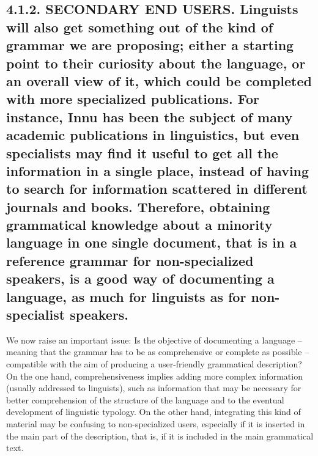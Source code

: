 \documentclass[letterpaper]{article}
\begin{document}
\subsection[4.1.2. SECONDARY END USERS. Linguists will also get something out of the kind of grammar we are proposing; either a starting point to their curiosity about the language, or an overall view of it, which could be completed with more specialized publications. For instance, Innu has been the subject of many academic publications in linguistics, but even specialists may find it useful to get all the information in a single place, instead of having to search for information scattered in different journals and books. Therefore, obtaining grammatical knowledge about a minority language in one single document, that is in a reference grammar for non{}-specialized speakers, is a good way of documenting a language, as much for linguists as for non{}-specialist speakers.]{4.1.2. SECONDARY END USERS. \textmd{L}\textmd{inguists will also get something out }\textmd{of }\textmd{the kind of grammar we }\textmd{are }\textmd{propos}\textmd{ing;}\textmd{ }\textmd{either}\textmd{ a starting point to their curiosity about the language, or an overall view of it, which could be completed with more specialized publications. For instance, Innu }\textmd{has been}\textmd{ the subject of many }\textmd{academic }\textmd{publications in linguistics, but even specialists may }\textmd{find it }\textmd{useful to get all }\textmd{the }\textmd{information in }\textmd{a single }\textmd{place, instead of having to }\textmd{search }\textmd{for information}\textmd{ scattered}\textmd{ in different journals and books}\textmd{. Therefore, }\textmd{obtaining }\textmd{grammatical knowledge about a minority language in }\textmd{one single document}\textmd{, that is in a reference grammar for }\textmd{non-specialized }\textmd{speakers, is a good way }\textmd{of}\textmd{ document}\textmd{ing}\textmd{ }\textmd{a }\textmd{language, as much for linguists }\textmd{as }\textmd{for non-specialist speakers.}}
We now raise an important issue: Is the objective of documenting a language -- meaning that the grammar has to be as comprehensive or complete as possible -- compatible with the aim of producing a user-friendly grammatical description? On the one hand, comprehensiveness implies adding more complex information (usually addressed to linguists), such as information that may be necessary for better comprehension of the structure of the language and to the eventual development of linguistic typology. On the other hand, integrating this kind of material may be confusing to non-specialized users, especially if it is inserted in the main part of the description, that is, if it is included in the main grammatical text.
\end{document}

